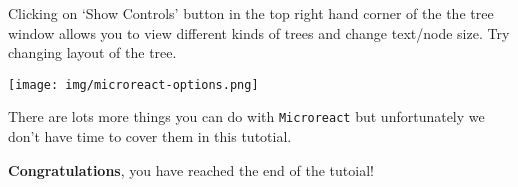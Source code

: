\documentclass[11pt]{article}
\begin{document}
Clicking on `Show Controls' button in the top right hand corner of the
the tree window allows you to view different kinds of trees and change
text/node size. Try changing layout of the tree.


\begin{center}
\texttt{[image: img/microreact-options.png]}
\end{center}


There are lots more things you can do with \texttt{Microreact} but
unfortunately we don't have time to cover them in this tutotial.

\textbf{Congratulations}, you have reached the end of the tutoial!


\end{document}
